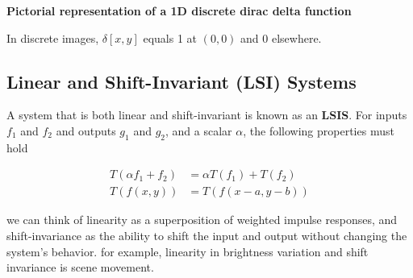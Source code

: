 \noindent \textbf{Pictorial representation of a 1D discrete dirac delta function}
\begin{center}
\end{center}

In discrete images, \( \delta[x,y] \) equals 1 at \((0,0)\) and 0 elsewhere.

\subsection{Linear and Shift-Invariant (LSI) Systems}
A system that is both linear and shift-invariant is known as an \textbf{LSIS}. For inputs $f_1$ and $f_2$ and outputs \( g_1 \) and \( g_2 \), and a scalar \( \alpha \), the following properties must hold

\begin{align*}
T(\alpha f_1 + f_2) &= \alpha T(f_1) + T(f_2) \\
T(f(x,y)) &= T(f(x-a,y-b))
\end{align*}  

we can think of linearity as a superposition of weighted impulse responses, and shift-invariance as the ability to shift the input and output without changing the system's behavior. for example, linearity in brightness variation and shift invariance is scene movement.

